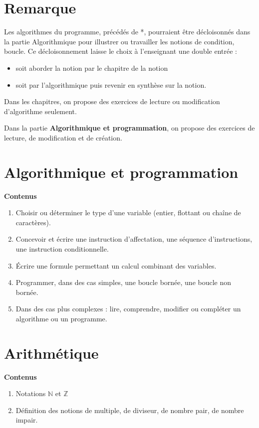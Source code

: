 \documentclass[10pt,a4paper]{article}
\begin{document}
\section*{Remarque}

Les algorithmes du programme, précédés de *, pourraient être décloisonnés dans la partie Algorithmique pour illustrer ou travailler les notions de condition, boucle.
Ce décloisonnement laisse le choix à l'enseignant une double entrée : 
\begin{itemize}
\item soit aborder la notion par le chapitre de la notion
\item soit par l'algorithmique puis revenir en synthèse sur la notion.
\end{itemize}

Dans les chapitres, on propose des exercices de lecture ou modification d'algorithme seulement. 

Dans la partie \textbf{Algorithmique et programmation}, on propose des exercices de  lecture, de  modification et de création.

\section{Algorithmique et programmation}

\textbf{Contenus}

\begin{enumerate} 
\item  Choisir ou déterminer le type d'une variable (entier, flottant ou chaîne de caractères).
\item  Concevoir et écrire une instruction d'affectation, une séquence d'instructions, une 
instruction conditionnelle.
\item Écrire une formule permettant un calcul combinant des variables.
\item Programmer, dans des cas simples, une boucle bornée, une boucle non bornée.
\item Dans des cas plus complexes : lire, comprendre, modifier ou compléter un algorithme 
ou un programme.
\end{enumerate}


\section{Arithmétique}

\textbf{Contenus}

\begin{enumerate}
\item Notations $\mathbb{N}$ et $\mathbb{Z}$
\item Définition des notions de multiple, de diviseur, de nombre pair, de nombre impair.
\end{enumerate}
\end{document}
